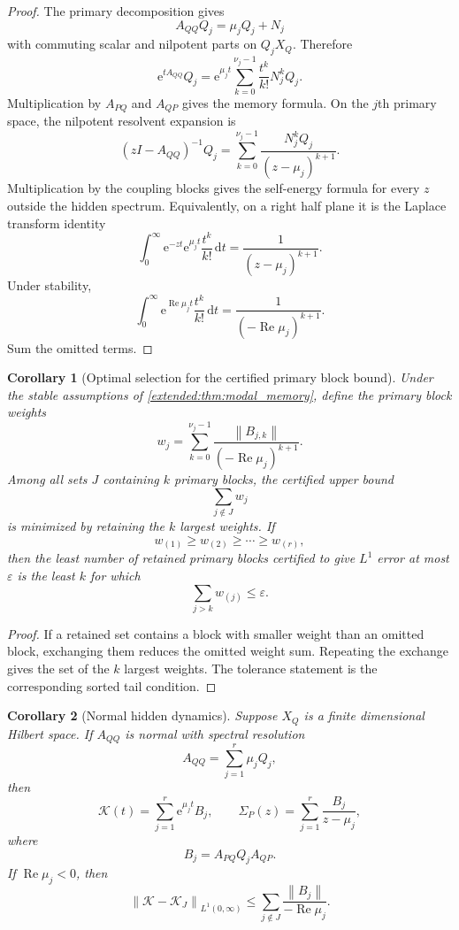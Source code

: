 \documentclass[11pt,letterpaper]{article}
\theoremstyle{plain}
\theoremstyle{plain}
\theoremstyle{plain}
\newtheorem{corollary}[corollary]{Corollary}
\theoremstyle{definition}
\theoremstyle{definition}
\theoremstyle{definition}
\theoremstyle{definition}
\theoremstyle{definition}
\theoremstyle{remark}
\theoremstyle{remark}
\theoremstyle{remark}
\theoremstyle{remark}
\theoremstyle{remark}
\newcommand{\norm}[1]{\left\lVert#1\right\rVert}
\theoremstyle{remark}
\newcommand{\Kcal}{\mathcal K}
\newcommand{\e}{\mathrm e}
\newcommand{\dd}{\,\mathrm d}
\let\KomorebiPrimitiveMathcal\mathcal
\renewcommand{\mathcal}[1]{{\KomorebiPrimitiveMathcal{#1}}}
\let\KomorebiPrimitivemathrm\mathrm
\renewcommand{\mathrm}[1]{{\KomorebiPrimitivemathrm{#1}}}
\begin{document}
\begin{proof}
The primary decomposition gives
\[
A_{QQ}Q_j=\mu_jQ_j+N_j
\]
with commuting scalar and nilpotent parts on \(Q_jX_Q\). Therefore
\[
\e^{tA_{QQ}}Q_j
=
\e^{\mu_jt}
\sum_{k=0}^{\nu_j-1}
\frac{t^k}{k!}N_j^kQ_j.
\]
Multiplication by \(A_{PQ}\) and \(A_{QP}\) gives the memory formula. On the \(j\)th primary space, the nilpotent resolvent expansion is
\[
(zI-A_{QQ})^{-1}Q_j
=
\sum_{k=0}^{\nu_j-1}
\frac{N_j^kQ_j}{(z-\mu_j)^{k+1}}.
\]
Multiplication by the coupling blocks gives the self-energy formula for every \(z\) outside the hidden spectrum. Equivalently, on a right half plane it is the Laplace transform identity
\[
\int_0^\infty
\e^{-zt}\e^{\mu_jt}
\frac{t^k}{k!}
\dd t
=
\frac{1}{(z-\mu_j)^{k+1}}.
\]
Under stability,
\[
\int_0^\infty
\e^{\operatorname{Re}\mu_jt}
\frac{t^k}{k!}
\dd t
=
\frac{1}{(-\operatorname{Re}\mu_j)^{k+1}}.
\]
Sum the omitted terms.
\end{proof}

\begin{corollary}[Optimal selection for the certified primary block bound]\label{extended:record:090}\label{extended:cor:optimal_primary_selection}
Under the stable assumptions of \cref{extended:thm:modal_memory}, define the primary block weights
\[
w_j
=
\sum_{k=0}^{\nu_j-1}
\frac{\norm{B_{j,k}}}
{(-\operatorname{Re}\mu_j)^{k+1}}.
\]
Among all sets \(J\) containing \(k\) primary blocks, the certified upper bound
\[
\sum_{j\notin J}w_j
\]
is minimized by retaining the \(k\) largest weights. If
\[
w_{(1)}\geq w_{(2)}\geq\cdots\geq w_{(r)},
\]
then the least number of retained primary blocks certified to give \(L^1\) error at most \(\varepsilon\) is the least \(k\) for which
\[
\sum_{j>k}w_{(j)}\leq\varepsilon.
\]
\end{corollary}

\begin{proof}
If a retained set contains a block with smaller weight than an omitted block, exchanging them reduces the omitted weight sum. Repeating the exchange gives the set of the \(k\) largest weights. The tolerance statement is the corresponding sorted tail condition.
\end{proof}

\begin{corollary}[Normal hidden dynamics]\label{extended:record:091}\label{extended:cor:normal_modal_memory}
Suppose \(X_Q\) is a finite dimensional Hilbert space. If \(A_{QQ}\) is normal with spectral resolution
\[
A_{QQ}=\sum_{j=1}^r\mu_jQ_j,
\]
then
\[
\Kcal(t)=\sum_{j=1}^r\e^{\mu_jt}B_j,
\qquad
\Sigma_P(z)=\sum_{j=1}^r\frac{B_j}{z-\mu_j},
\]
where
\[
B_j=A_{PQ}Q_jA_{QP}.
\]
If \(\operatorname{Re}\mu_j<0\), then
\[
\norm{\Kcal-\Kcal_J}_{L^1(0,\infty)}
\leq
\sum_{j\notin J}
\frac{\norm{B_j}}{-\operatorname{Re}\mu_j}.
\]
\end{corollary}
\end{document}
